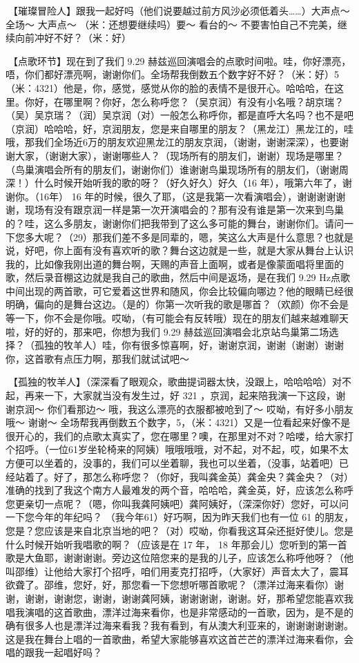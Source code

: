 \documentclass[
]{book}
\begin{document}
🎵【璀璨冒险人】跟我一起好吗（他们说要越过前方风沙必须低着头\ldots\ldots）大声点～ 全场～ 大声点～ （米：还想要继续吗）要～ 看台的～ 不要害怕自己不完美，继续向前冲好不好？（米：好）

🎵【点歌环节】现在到了我们 9.29 赫兹巡回演唱会的点歌时间啦。哇，你好漂亮，唔，你们都好漂亮啊，谢谢你们。全场帮我倒数五个数字好不好？（米：好）5（米：4321）他是，你，感觉，感觉从你的脸的表情不是很开心。哈哈哈，在这里。你好，在哪里啊？你好，怎么称呼您？（吴京润）有没有小名哦？胡京瑞？（吴）吴京瑞？（润）吴京润（对）一般怎么称呼你，都是直呼大名吗？也不是吧（京润）哈哈哈，好，京润朋友，您是来自哪里的朋友？（黑龙江）黑龙江的，哇哦，那我们全场近6万的朋友欢迎黑龙江的朋友京润，（谢谢，谢谢深深），也要谢谢大家，（谢谢大家），谢谢哪些人？（现场所有的朋友们，谢谢）现场是哪里？（鸟巢演唱会所有的朋友们，谢谢你们）谁谢谢鸟巢现场所有的朋友们，（谢谢周深！）什么时候开始听我的歌的呀？（好久好久）好久（16 年），哦第六年了，谢谢你。（16年） 16 年的时候，很久了耶，（这是我第一次看演唱会），谢谢谢谢谢谢，现场有没有跟京润一样是第一次开演唱会的？那有没有谁是第一次来到鸟巢的？哇，这么多朋友，谢谢你们把我带到了这么多可能的舞台，谢谢你们。请问一下您多大呢？（29）那我们差不多是同辈的，嗯，笑这么大声是什么意思？也就是说，好吧，你上面有没有喜欢听的歌？舞台这边就是一些，就是大家从舞台上认识我的，比如像我刚出道的舞台啊，天赐的声音上面啊，或者是像蒙面唱将里面的歌，然后录音棚这边就是我自己的歌曲，然后中间是返场，是在我们 9.29 Hz点歌中间出现的两首歌，可它爱着这世界和随风，你会比较偏向哪边？他的眼睛已经很明确，偏向的是舞台这边。（是的）你第一次听我的歌是哪首？（欢颜）你不会是等一下，你不会是你哦。哎呦，（有可能会有反转哦）现在的朋友们越来越难聊天啦，好的好的，那来吧，你想为我们 9.29 赫兹巡回演唱会北京站鸟巢第二场选择？（孤独的牧羊人）哇，你有很多惊喜啊，好，谢谢京润，谢谢（谢谢）谢谢你，这首歌有点压力啊，那我们就试试吧～

🎵【孤独的牧羊人】（深深看了眼观众，歌曲提词器太快，没跟上，哈哈哈哈）对不起，再来一下，大家就当没有发生过，好 321 ，京润，起来陪我演一下这段，谢谢京润～ 你们看那边～ 哦，我这么漂亮的衣服都被呛到了～ 哎呦，有好多小朋友哦～ 谢谢～
全场帮我再倒数五个数字，5，（米：4321）又是一位看起来好像不是很开心的，我们的点歌太真实了，您在哪里？噢，在那里对不对？哈喽，给大家打个招呼。（一位61岁坐轮椅来的阿姨）哦哦哦哦，对不起，对不起，哎，如果不太方便可以坐着的，没事的，我们可以坐着聊，我也可以坐着，（没事，站着吧）已经站着了。好了，那怎么称呼您？（你好，我叫龚金英）龚金央？龚金央？（对）准确的找到了我这个南方人最难发的两个音，哈哈哈，龚金英，好，应该怎么称呼您更亲切一点呢？（嗯，你叫我龚阿姨吧）龚阿姨好，（深深你好）您好，可以问一下您今年的年纪吗？
（我今年61）好巧啊，因为昨天我们也有一位 61 的朋友，您是？您应该是来自北京当地的吧？（对）哎呦，你看我这耳朵还挺好使儿。您是什么时候开始听我唱歌的啊？（应该是在 17 年， 18 年那会儿）您听到的第一首歌是大鱼耶，谢谢谢谢。旁边这位陪您来的是我的儿子，应该怎么称呼他呀？（他叫邵维）让他给大家打个招呼，咱们用麦克打招呼，（大家好）声音太大了，震耳欲聋了。邵维，您好，好，那您看一下您想听哪首歌呢？（漂洋过海来看你）谢谢，谢谢，谢谢您，谢谢，谢谢龚阿姨，谢谢谢谢，谢谢。好，那希望您能喜欢我唱我演唱的这首歌曲，漂洋过海来看你，也是非常感动的一首歌，因为，是不是的确有很多人也是漂洋过海来看我？我有看到，有从澳大利亚来的，谢谢谢谢谢谢。这是我在舞台上唱的一首歌曲，希望大家能够喜欢这首芒芒的漂洋过海来看你，会唱的跟我一起唱好吗？
\end{document}
